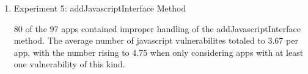 \begin{enumerate}
    \item Experiment 5: addJavascriptInterface Method
    
    80 of the 97 apps contained improper handling of the addJavascriptInterface
    method. The average number of javascript vulnerabilites totaled to 
    3.67 per app, with the number rising to 4.75 when only considering
    apps with at least one vulnerability of this kind.

\end{enumerate}





